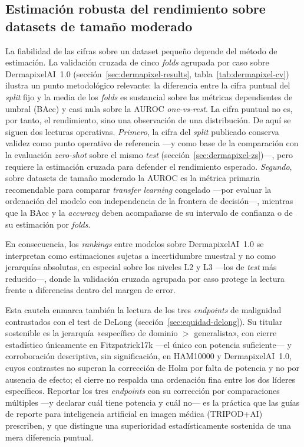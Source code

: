 \subsection{Estimación robusta del rendimiento sobre datasets de tamaño moderado}
\label{sec:disc-cv-robustez}

La fiabilidad de las cifras sobre un dataset pequeño depende del método
de estimación. La validación cruzada de cinco \emph{folds} agrupada por
caso sobre DermapixelAI~1.0 (sección~\ref{sec:dermapixel-results},
tabla~\ref{tab:dermapixel-cv}) ilustra un punto metodológico relevante:
la diferencia entre la cifra puntual del \emph{split} fijo y la media de
los \emph{folds} es sustancial sobre las métricas dependientes de umbral
(BAcc) y casi nula sobre la AUROC \emph{one-vs-rest}. La cifra puntual
no es, por tanto, el rendimiento, sino una observación de una
distribución. De aquí se siguen dos lecturas operativas. \textit{Primero},
la cifra del \emph{split} publicado conserva validez como punto operativo
de referencia ---y como base de la comparación con la evaluación
\emph{zero-shot} sobre el mismo \emph{test}
(sección~\ref{sec:dermapixel-zs})---, pero requiere la estimación cruzada
para defender el rendimiento esperado. \textit{Segundo}, sobre datasets
de tamaño moderado la AUROC es la métrica primaria recomendable para
comparar \emph{transfer learning} congelado ---por evaluar la ordenación
del modelo con independencia de la frontera de decisión---, mientras que
la BAcc y la \emph{accuracy} deben acompañarse de su intervalo de
confianza o de su estimación por \emph{folds}.

En consecuencia, los \emph{rankings} entre modelos sobre DermapixelAI~1.0
se interpretan como estimaciones sujetas a incertidumbre muestral y no
como jerarquías absolutas, en especial sobre los niveles L2 y L3 ---los
de \emph{test} más reducido---, donde la validación cruzada agrupada por
caso protege la lectura frente a diferencias dentro del margen de error.

Esta cautela enmarca también la lectura de los tres \emph{endpoints} de
malignidad contrastados con el test de DeLong
(sección~\ref{sec:equidad-delong}). Su titular sostenible es la
jerarquía «específico de dominio $>$ generalista», con cierre
estadístico únicamente en Fitzpatrick17k ---el único con potencia
suficiente--- y corroboración descriptiva, sin significación, en
HAM10000 y DermapixelAI~1.0, cuyos contrastes no superan la corrección
de Holm por falta de potencia y no por ausencia de efecto; el cierre no
respalda una ordenación fina entre los dos líderes específicos.
Reportar los tres \emph{endpoints} con su corrección por comparaciones
múltiples ---y declarar cuál tiene potencia y cuál no--- es la práctica
que las guías de reporte para inteligencia artificial en imagen médica
(TRIPOD+AI) prescriben, y que distingue una superioridad
estadísticamente sostenida de una mera diferencia puntual.

